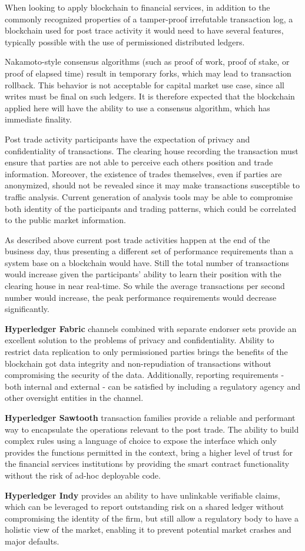 When looking to apply blockchain to financial services, in addition to the commonly recognized properties of a tamper-proof irrefutable transaction log, a blockchain used for post trace activity it would need to have several features, typically possible with the use of permissioned distributed ledgers.

Nakamoto-style consensus algorithms (such as proof of work, proof of stake, or proof of elapsed time) result in temporary forks, which may lead to transaction rollback. This behavior is not acceptable for capital market use case, since all writes must be final on such ledgers. It is therefore expected that the blockchain applied here will have the ability to use a consensus algorithm, which has immediate finality.

Post trade activity participants have the expectation of privacy and confidentiality of transactions. The clearing house recording the transaction must ensure that parties are not able to perceive each others position and trade information. Moreover, the existence of trades themselves, even if parties are anonymized, should not be revealed since it may make transactions susceptible to traffic analysis. Current generation of analysis tools may be able to compromise both identity of the participants and trading patterns, which could be correlated to the public market information.

As described above current post trade activities happen at the end of the business day, thus presenting a different set of performance requirements than a system base on a blockchain would have. Still the total number of transactions would increase given the participants' ability to learn their position with the clearing house in near real-time. So while the average transactions per second number would increase, the peak performance requirements would decrease significantly.

\textbf{Hyperledger Fabric} channels combined with separate endorser sets provide an excellent solution to the problems of privacy and confidentiality. Ability to restrict data replication to only permissioned parties brings the benefits of the blockchain got data integrity and non-repudiation of transactions without compromising the security of the data. Additionally, reporting requirements - both internal and external - can be satisfied by including a regulatory agency and other oversight entities in the channel.

\textbf{Hyperledger Sawtooth} transaction families provide a reliable and performant way to encapsulate the operations relevant to the post trade. The ability to build complex rules using a language of choice to expose the interface which only provides the functions permitted in the context, bring a higher level of trust for the financial services institutions by providing the smart contract functionality without the risk of ad-hoc deployable code.

\textbf{Hyperledger Indy} provides an ability to have unlinkable verifiable claims, which can be leveraged to report outstanding risk on a shared ledger without compromising the identity of the firm, but still allow a regulatory body to have a holistic view of the market, enabling it to prevent potential market crashes and major defaults.
